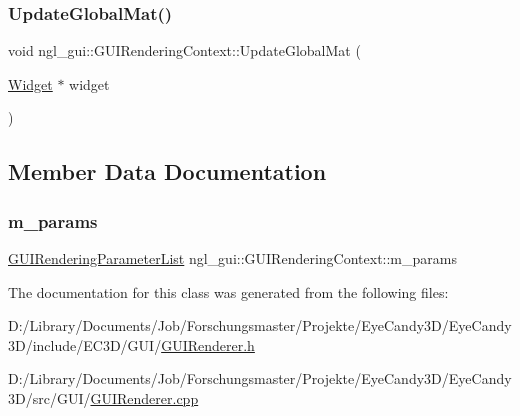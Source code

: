\mbox{\label{classngl__gui_1_1_g_u_i_rendering_context_a97eb947aabbb15f4a816f0273bb8afd8}} 
\subsubsection{\texorpdfstring{Update\+Global\+Mat()}{UpdateGlobalMat()}}
{\footnotesize\ttfamily void ngl\+\_\+gui\+::\+G\+U\+I\+Rendering\+Context\+::\+Update\+Global\+Mat (\begin{DoxyParamCaption}\item[{\mbox{\hyperlink{classngl__gui_1_1_widget}{Widget}} $\ast$}]{widget }\end{DoxyParamCaption})}



\subsection{Member Data Documentation}
\mbox{\label{classngl__gui_1_1_g_u_i_rendering_context_a6eec556788614881c0d087fd52e42b43}} 
\subsubsection{\texorpdfstring{m\+\_\+params}{m\_params}}
{\footnotesize\ttfamily \mbox{\hyperlink{structngl__gui_1_1_g_u_i_rendering_parameter_list}{G\+U\+I\+Rendering\+Parameter\+List}} ngl\+\_\+gui\+::\+G\+U\+I\+Rendering\+Context\+::m\+\_\+params}



The documentation for this class was generated from the following files\+:\begin{DoxyCompactItemize}
\item 
D\+:/\+Library/\+Documents/\+Job/\+Forschungsmaster/\+Projekte/\+Eye\+Candy3\+D/\+Eye\+Candy3\+D/include/\+E\+C3\+D/\+G\+U\+I/\mbox{\hyperlink{_g_u_i_renderer_8h}{G\+U\+I\+Renderer.\+h}}\item 
D\+:/\+Library/\+Documents/\+Job/\+Forschungsmaster/\+Projekte/\+Eye\+Candy3\+D/\+Eye\+Candy3\+D/src/\+G\+U\+I/\mbox{\hyperlink{_g_u_i_renderer_8cpp}{G\+U\+I\+Renderer.\+cpp}}\end{DoxyCompactItemize}
